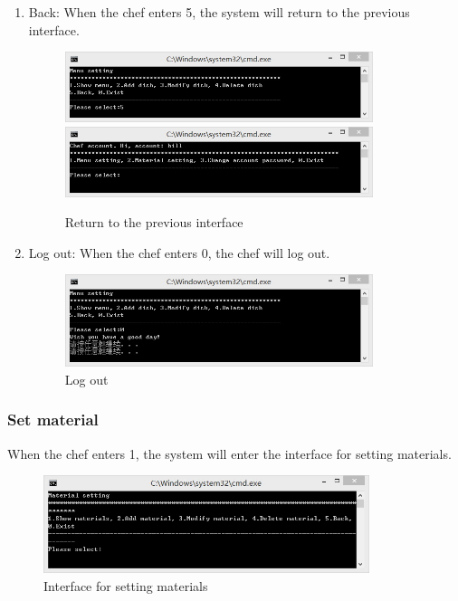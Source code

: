 \documentclass{article}
\begin{document}
\begin{enumerate}
    
    \item Back:\newline 
    When the chef enters 5, the system will return to the previous interface.
        \begin{figure}[H]
        \centering
        \includegraphics[width=0.85\textwidth]{Q/1/Q_5a.jpg}
        \includegraphics[width=0.85\textwidth]{Q/1/Q_5b.jpg}
        \caption{Return to the previous interface}
        \end{figure}
        
    \item Log out:\newline
    When the chef enters 0, the chef will log out.
        \begin{figure}[H]
        \centering
        \includegraphics[width=0.85\textwidth]{Q/1/Q_0.jpg}
        \caption{Log out}
        \end{figure}
        
\end{enumerate}


\subsubsection{Set material}
When the chef enters 1, the system will enter the interface for setting materials.
\begin{figure}[H]
    \centering
    \includegraphics[width=0.85\textwidth]{Q/2/Q_0b2.jpg}
    \caption{Interface for setting materials}
\end{figure}
\end{document}
